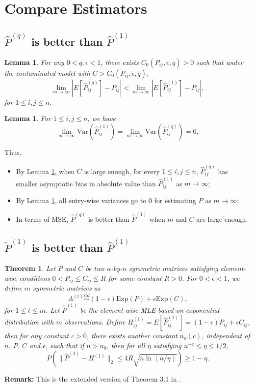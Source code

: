 \documentclass[a4paper]{article}
\newtheorem{lemma}[fact]{Lemma}
\newtheorem{theorem}[fact]{Theorem}
\begin{document}
\section{Compare Estimators}

\subsection{$\hat{P}^{(q)}$ is better than $\hat{P}^{(1)}$}

\begin{lemma}
\label{lemma:ELqlEMLE}
For any $0 < q, \epsilon < 1$, there exists $C_0(P_{ij}, \epsilon, q) > 0$ such that under the contaminated model with $C > C_0(P_{ij}, \epsilon, q)$,
\[
	\lim_{m \to \infty} \left| E[\hat{P}^{(q)}_{ij}] - P_{ij} \right| < 
    \lim_{m \to \infty} \left| E[\hat{P}^{(1)}_{ij}] - P_{ij} \right|,
\]
for $1 \le i, j \le n$.
\end{lemma}

\begin{lemma}
\label{lemma:VarMLEandLq0}
For $1 \le i, j \le n$, we have
\[
	\lim_{m \to \infty} \mathrm{Var}(\hat{P}^{(1)}_{ij})
    = \lim_{m \to \infty} \mathrm{Var}(\hat{P}^{(q)}_{ij}) = 0,
\]
\end{lemma}
Thus,
\begin{itemize}
\item By Lemma \ref{lemma:ELqlEMLE}, when $C$ is large enough, for every $1 \le i, j \le n$, $\hat{P}_{ij}^{(q)}$ has smaller asymptotic bias in absolute value than $\hat{P}_{ij}^{(1)}$ as $m \to \infty$;
\item By Lemma \ref{lemma:VarMLEandLq0}, all entry-wise variances go to 0 for estimating $P$ as $m \to \infty$;
\item In terms of MSE, $\hat{P}^{(q)}$ is better than $\hat{P}^{(1)}$ when $m$ and $C$ are large enough.
\end{itemize}






\subsection{$\widetilde{P}^{(1)}$ is better than $\hat{P}^{(1)}$}

\begin{theorem}
\label{thm:P1Diff}
Let $P$ and $C$ be two $n$-by-$n$ symmetric matrices satisfying element-wise conditions $0 < P_{ij} \le C_{ij} \le R$ for some constant $R > 0$. For $0 < \epsilon < 1$, we define $m$ symmetric matrices as
\[
	A^{(t)} \stackrel{iid}{\sim} (1-\epsilon) \mathrm{Exp}(P) + \epsilon \mathrm{Exp}(C),
\]
for $1 \le t \le m$.
Let $\hat{P}^{(1)}$ be the element-wise MLE based on exponential distribution with $m$ observations.
Define $H_{ij}^{(1)} = E[\hat{P}_{ij}^{(1)}] = (1-\epsilon) P_{ij} + \epsilon C_{ij}$,
then for any constant $c > 0$, there exists another constant $n_0(c)$, independent of $n$, $P$, $C$ and $\epsilon$, such that if $n > n_0$, then for all $\eta$ satisfying $n^{-c} \le \eta \le 1/2$,
\[
	P \left( \| \hat{P}^{(1)} - H^{(1)} \|_2 \le 4 R \sqrt{n \ln(n/\eta)}\right) \ge 1 - \eta.
\]
\end{theorem}
\textbf{Remark:} This is the extended version of Theorem 3.1 in \cite{oliveira2009concentration}.
\end{document}
